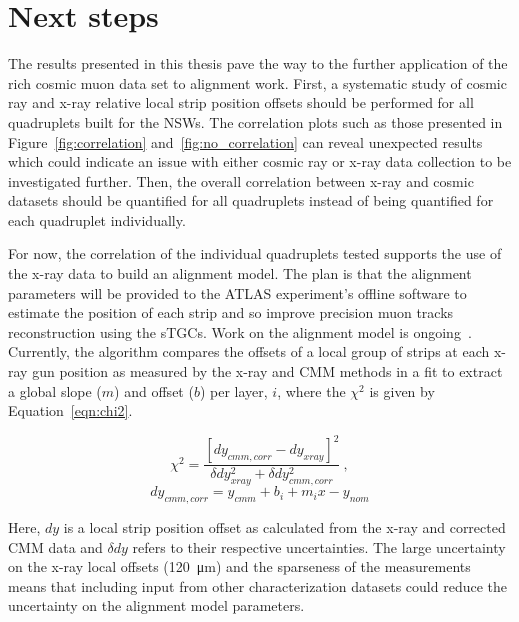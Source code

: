 \section{Next steps}

The results presented in this thesis pave the way to the further application of the rich cosmic muon data set to alignment work. First, a systematic study of cosmic ray and x-ray relative local strip position offsets should be performed for all quadruplets built for the NSWs. The correlation plots such as those presented in Figure~\ref{fig:correlation} and~\ref{fig:no_correlation} can reveal unexpected results which could indicate an issue with either cosmic ray or x-ray data collection to be investigated further. Then, the overall correlation between x-ray and cosmic datasets should be quantified for all quadruplets instead of being quantified for each quadruplet individually.
 
For now, the correlation of the individual quadruplets tested supports the use of the x-ray data to build an alignment model. The plan is that the alignment parameters will be provided to the ATLAS experiment's offline software to estimate the position of each strip and so improve precision muon tracks reconstruction using the sTGCs. Work on the alignment model is ongoing~\cite{lefebvre_precision_2020}. Currently, the algorithm compares the offsets of a local group of strips at each x-ray gun position as measured by the x-ray and CMM methods in a fit to extract a global slope ($m$) and offset ($b$) per layer, $i$, where the $\chi^2$ is given by Equation~\ref{eqn:chi2}.

\begin{equation}
    \chi^2 = \frac{\left[dy_{cmm, corr} - dy_{xray}\right]^2}{\delta dy_{xray}^2 + \delta dy_{cmm, corr}^2}\:,
    \label{eqn:chi2}  
\end{equation}
\begin{equation}
    dy_{cmm, corr} = y_{cmm} + b_i + m_{i}x - y_{nom}
    \label{eqn:dy_cmm_corr}
\end{equation}

Here, $dy$ is a local strip position offset as calculated from the x-ray and corrected CMM data and $\delta dy$ refers to their respective uncertainties. The large uncertainty on the x-ray local offsets (\SI{120}{\micro\meter}) and the sparseness of the measurements means that including input from other characterization datasets could reduce the uncertainty on the alignment model parameters. 

